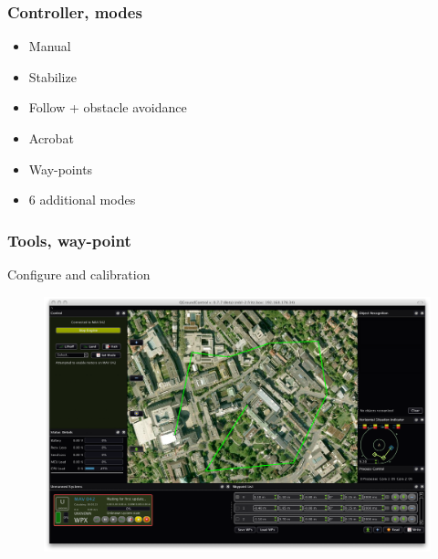 \begin{frame}
\frametitle{Controller, modes}

  \begin{itemize}
    \item Manual    
    \item Stabilize    
	\item Follow + obstacle avoidance
	\item Acrobat 	
    \item Way-points   
	\item 6 additional modes 
  \end{itemize}
  
\end{frame}



\begin{frame}
\frametitle{Tools, way-point}

  Configure and calibration
  \begin{figure}
  \includegraphics[scale=0.19]{pic/03_our-copter/qgroundcontrol.png}
  \end{figure}
  
\end{frame}



